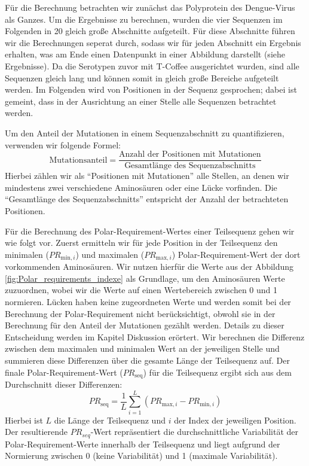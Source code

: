 \documentclass[german,version-2022-01]{uzl-thesis}
\begin{document}
F\"ur die Berechnung betrachten wir zun\"achst das Polyprotein des Dengue-Virus als Ganzes. Um die Ergebnisse zu berechnen, wurden die vier Sequenzen im Folgenden in 20 gleich gro\ss{}e Abschnitte aufgeteilt. F\"ur diese Abschnitte f\"uhren wir die Berechnungen seperat durch, sodass wir f\"ur jeden Abschnitt ein Ergebnis erhalten, was am Ende einen Datenpunkt in einer Abbildung darstellt (siehe Ergebnisse). Da die Serotypen zuvor mit T-Coffee ausgerichtet wurden, sind alle Sequenzen gleich lang und k\"onnen somit in gleich gro\ss{}e Bereiche aufgeteilt werden. Im Folgenden wird von Positionen in der Sequenz gesprochen; dabei ist gemeint, dass in der Ausrichtung an einer Stelle alle Sequenzen betrachtet werden.

Um den Anteil der Mutationen in einem Sequenzabschnitt zu quantifizieren, verwenden wir folgende Formel: 
\begin{equation}
    \text{Mutationsanteil} = \frac{\text{Anzahl der Positionen mit Mutationen}}{\text{Gesamtl\"ange des Sequenzabschnitts}} \label{eq:Anteil_an_Mutationen}
\end{equation}
Hierbei z\"ahlen wir als "`Positionen mit Mutationen"' alle Stellen, an denen wir mindestens zwei verschiedene Aminos\"auren oder eine L\"ucke vorfinden. Die "`Gesamtl\"ange des Sequenzabschnitts"' entspricht der Anzahl der betrachteten Positionen.

F\"ur die Berechnung des Polar-Requirement-Wertes einer Teilsequenz gehen wir wie folgt vor. Zuerst ermitteln wir f\"ur jede Position in der Teilsequenz den minimalen ($PR_{\text{min},i}$) und maximalen ($PR_{\text{max},i}$) Polar-Requirement-Wert der dort vorkommenden Aminos\"auren. Wir nutzen hierf\"ur die Werte aus der Abbildung \ref{fig:Polar_requirements_indexe} als Grundlage, um den Aminos\"auren Werte zuzuordnen, wobei wir die Werte auf einen Wertebereich zwischen 0 und 1 normieren. L\"ucken haben keine zugeordneten Werte und werden somit bei der Berechnung der Polar-Requirement nicht ber\"ucksichtigt, obwohl sie in der Berechnung f\"ur den Anteil der Mutationen gez\"ahlt werden. Details zu dieser Entscheidung werden im Kapitel Diskussion er\"ortert. Wir berechnen die Differenz zwischen dem maximalen und minimalen Wert an der jeweiligen Stelle und summieren diese Differenzen \"uber die gesamte L\"ange der Teilsequenz auf. Der finale Polar-Requirement-Wert ($PR_{\text{seq}}$) f\"ur die Teilsequenz ergibt sich aus dem Durchschnitt dieser Differenzen:
\begin{equation}
    PR_{\text{seq}} = \frac{1}{L} \sum_{i=1}^{L} (PR_{\text{max},i} - PR_{\text{min},i})
    \label{eq:polar_requirements}
\end{equation}
Hierbei ist $L$ die L\"ange der Teilsequenz und $i$ der Index der jeweiligen Position. Der resultierende $PR_{seq}$-Wert repr\"asentiert die durchschnittliche Variabilit\"at der Polar-Requirement-Werte innerhalb der Teilsequenz und liegt aufgrund der Normierung zwischen 0 (keine Variabilit\"at) und 1 (maximale Variabilit\"at).
\end{document}
